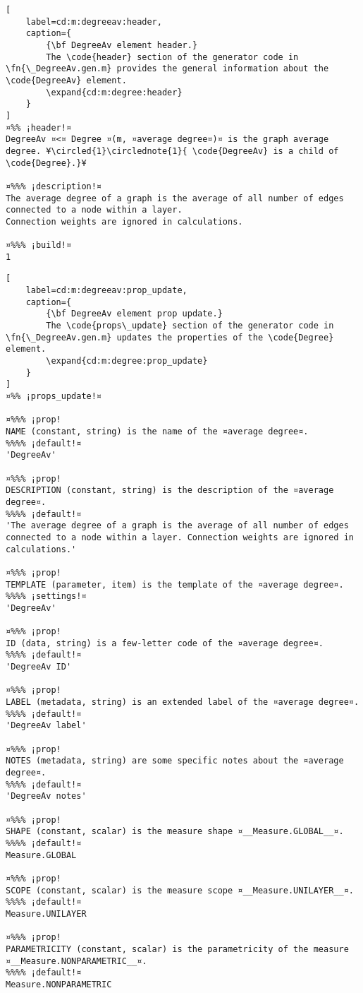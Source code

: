\documentclass{tufte-handout}
\begin{document}
\begin{lstlisting}[
	label=cd:m:degreeav:header,
	caption={
		{\bf DegreeAv element header.}
		The \code{header} section of the generator code in \fn{\_DegreeAv.gen.m} provides the general information about the \code{DegreeAv} element.
		\expand{cd:m:degree:header}
	}
]
¤%% ¡header!¤
DegreeAv ¤<¤ Degree ¤(m, ¤average degree¤)¤ is the graph average degree. ¥\circled{1}\circlednote{1}{ \code{DegreeAv} is a child of \code{Degree}.}¥

¤%%% ¡description!¤
The average degree of a graph is the average of all number of edges connected to a node within a layer. 
Connection weights are ignored in calculations.

¤%%% ¡build!¤
1
\end{lstlisting}

\begin{lstlisting}[
	label=cd:m:degreeav:prop_update,
	caption={
		{\bf DegreeAv element prop update.}
		The \code{props\_update} section of the generator code in \fn{\_DegreeAv.gen.m} updates the properties of the \code{Degree} element.
		\expand{cd:m:degree:prop_update}
	}
]
¤%% ¡props_update!¤

¤%%% ¡prop!
NAME (constant, string) is the name of the ¤average degree¤.
%%%% ¡default!¤
'DegreeAv'

¤%%% ¡prop!
DESCRIPTION (constant, string) is the description of the ¤average degree¤.
%%%% ¡default!¤
'The average degree of a graph is the average of all number of edges connected to a node within a layer. Connection weights are ignored in calculations.'

¤%%% ¡prop!
TEMPLATE (parameter, item) is the template of the ¤average degree¤.
%%%% ¡settings!¤
'DegreeAv'

¤%%% ¡prop!
ID (data, string) is a few-letter code of the ¤average degree¤.
%%%% ¡default!¤
'DegreeAv ID'

¤%%% ¡prop!
LABEL (metadata, string) is an extended label of the ¤average degree¤.
%%%% ¡default!¤
'DegreeAv label'

¤%%% ¡prop!
NOTES (metadata, string) are some specific notes about the ¤average degree¤.
%%%% ¡default!¤
'DegreeAv notes'

¤%%% ¡prop!
SHAPE (constant, scalar) is the measure shape ¤__Measure.GLOBAL__¤.
%%%% ¡default!¤
Measure.GLOBAL

¤%%% ¡prop!
SCOPE (constant, scalar) is the measure scope ¤__Measure.UNILAYER__¤.
%%%% ¡default!¤
Measure.UNILAYER

¤%%% ¡prop!
PARAMETRICITY (constant, scalar) is the parametricity of the measure ¤__Measure.NONPARAMETRIC__¤.
%%%% ¡default!¤
Measure.NONPARAMETRIC


\end{lstlisting}
\end{document}
